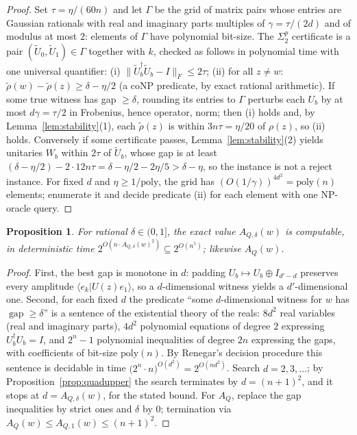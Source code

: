 \documentclass[11pt]{amsart}
\newtheorem{proposition}[theorem]{Proposition}
\theoremstyle{definition}
\theoremstyle{remark}
\newcommand{\AQ}{A_Q}
\newcommand{\gapp}{\operatorname{gap}}
\begin{document}
\begin{proof}
Set $\tau=\eta/(60n)$ and let $\Gamma$ be the grid of matrix pairs
whose entries are Gaussian rationals with real and imaginary parts
multiples of $\gamma=\tau/(2d)$ and of modulus at most $2$: elements
of $\Gamma$ have polynomial bit-size. The $\Sigma_2^p$ certificate is
a pair $(\widetilde U_0,\widetilde U_1)\in\Gamma$ together with $k$,
checked as follows in polynomial time with one universal quantifier:
(i) $\|\widetilde U_b^\dagger\widetilde U_b-I\|_F\le2\tau$; (ii) for
all $z\ne w$: $\widetilde\rho(w)-\widetilde\rho(z)\ge\delta-\eta/2$
(a coNP predicate, by exact rational arithmetic). If some true
witness has gap $\ge\delta$, rounding its entries to $\Gamma$
perturbs each $U_b$ by at most $d\gamma=\tau/2$ in Frobenius, hence
operator, norm; then (i) holds and, by
Lemma~\ref{lem:stability}(1), each $\widetilde\rho(z)$ is within
$3n\tau=\eta/20$ of $\rho(z)$, so (ii) holds. Conversely if some
certificate passes, Lemma~\ref{lem:stability}(2) yields unitaries
$W_b$ within $2\tau$ of $\widetilde U_b$, whose gap is at least
$(\delta-\eta/2)-2\cdot12n\tau=\delta-\eta/2-2\eta/5>\delta-\eta$,
so the instance is not a reject instance. For fixed $d$ and
$\eta\ge1/\mathrm{poly}$, the grid has
$(O(1/\gamma))^{4d^2}=\mathrm{poly}(n)$ elements; enumerate it and
decide predicate (ii) for each element with one NP-oracle query.
\end{proof}

\begin{proposition}\label{prop:exact}
For rational $\delta\in(0,1]$, the exact value $A_{Q,\delta}(w)$ is
computable, in deterministic time
$2^{O(n\cdot A_{Q,\delta}(w)^2)}\subseteq2^{O(n^5)}$; likewise
$\AQ(w)$.
\end{proposition}

\begin{proof}
First, the best gap is monotone in $d$: padding $U_b\mapsto
U_b\oplus I_{d'-d}$ preserves every amplitude
$\langle e_k|U(z)e_1\rangle$, so a $d$-dimensional witness yields a
$d'$-dimensional one. Second, for each fixed $d$ the predicate
``some $d$-dimensional witness for $w$ has $\gapp\ge\delta$'' is a
sentence of the existential theory of the reals: $8d^2$ real
variables (real and imaginary parts), $4d^2$ polynomial equations of
degree $2$ expressing $U_b^\dagger U_b=I$, and $2^n-1$ polynomial
inequalities of degree $2n$ expressing the gaps, with coefficients of
bit-size $\mathrm{poly}(n)$. By Renegar's decision procedure
\cite{Ren92} this sentence is decidable in time
$\bigl(2^n\cdot n\bigr)^{O(d^2)}=2^{O(nd^2)}$. Search
$d=2,3,\dots$; by Proposition~\ref{prop:quadupper} the search
terminates by $d=(n+1)^2$, and it stops at $d=A_{Q,\delta}(w)$, for
the stated bound. For $\AQ$, replace the gap inequalities by strict
ones and $\delta$ by $0$; termination via
$\AQ(w)\le A_{Q,1}(w)\le(n+1)^2$.
\end{proof}
\end{document}
